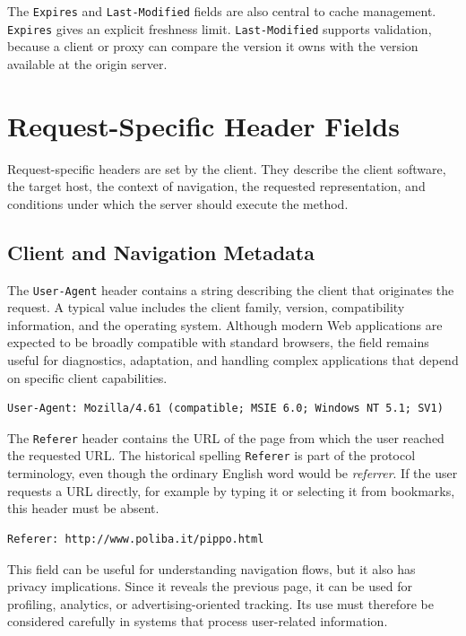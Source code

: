 \documentclass{scrbook}
\begin{document}
The \texttt{Expires} and \texttt{Last-Modified} fields are also central to cache management. \texttt{Expires} gives an explicit freshness limit. \texttt{Last-Modified} supports validation, because a client or proxy can compare the version it owns with the version available at the origin server.

\section{Request-Specific Header Fields}

Request-specific headers are set by the client. They describe the client software, the target host, the context of navigation, the requested representation, and conditions under which the server should execute the method.

\subsection{Client and Navigation Metadata}

The \texttt{User-Agent} header contains a string describing the client that originates the request. A typical value includes the client family, version, compatibility information, and the operating system. Although modern Web applications are expected to be broadly compatible with standard browsers, the field remains useful for diagnostics, adaptation, and handling complex applications that depend on specific client capabilities.

\begin{lstlisting}
User-Agent: Mozilla/4.61 (compatible; MSIE 6.0; Windows NT 5.1; SV1)
\end{lstlisting}

The \texttt{Referer} header contains the URL of the page from which the user reached the requested URL. The historical spelling \texttt{Referer} is part of the protocol terminology, even though the ordinary English word would be \emph{referrer}. If the user requests a URL directly, for example by typing it or selecting it from bookmarks, this header must be absent.

\begin{lstlisting}
Referer: http://www.poliba.it/pippo.html
\end{lstlisting}

This field can be useful for understanding navigation flows, but it also has privacy implications. Since it reveals the previous page, it can be used for profiling, analytics, or advertising-oriented tracking. Its use must therefore be considered carefully in systems that process user-related information.
\end{document}
